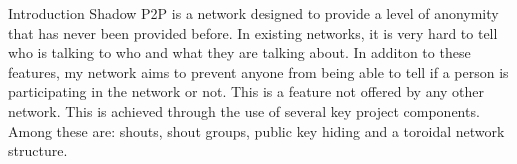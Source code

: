\documentclass[ %
                    author={Luke Murray},
                supervisor={Dr. Simon Hollis},
                     title={Shadow Peer-to-Peer Networks},
                  subtitle={},
                    degree={MEng},
                      year={2013} ]{poster}
\begin{document}

\begin{frame}{} 

\vfill

\begin{columns}[t]
    \begin{column}{0.900\linewidth}
    \begin{block}{\normalsize Introduction}
    \small Shadow P2P is a network designed to provide a level of anonymity that has never been provided before. In existing networks, it is very hard to tell who is talking to who and what they are talking about. In additon to these features, my network aims to prevent anyone from being able to tell if a person is participating in the network or not. This is a feature not offered by any other network. This is achieved through the use of several key project components. Among these are: shouts, shout groups, public key hiding and a toroidal network structure.
    \end{block}
    \end{column}
\end{columns}

\vfill


\end{frame}
\end{document}
